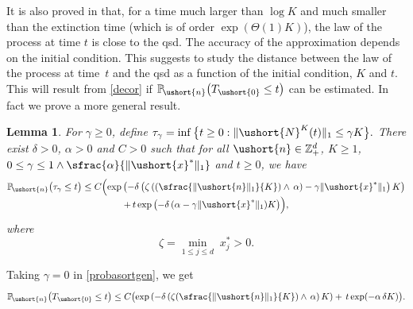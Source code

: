\documentclass[10pt]{amsart}
\newcommand{\Psfrac}[2]{(\sfrac{#1}{#2})}
\numberwithin{equation}{section}
\theoremstyle{plain}
\newtheorem{lemma}[theorem]{Lemma}
\theoremstyle{definition}
\newcommand{\proba}{{\mathbb{P}}}
\newcommand{\zentiers}{{\mathbb{Z}}}
\newcommand{\domaine}{\zentiers_{+}^{d}}
\newcommand{\Thetaun}{\Theta(1)}
\newcommand{\vecn}{\ushort{n}}
\newcommand{\vecxf}{\ushort{x}^*}
\newcommand{\veczer}{\ushort{0}}
\newcommand{\leproc}{\ushort{N}^{K}}
\newcommand{\norm}[1]{\|#1\|_{1}}\let\snorm\norm
\begin{document}
It is also proved in \cite{ccm2} that, for a time much larger than $\log K$ and much smaller than the extinction time
(which is of order $\exp(\Thetaun K)$), the law of the process at time $t$ is close to the qsd. The accuracy of the
approximation depends on the initial condition. This suggests to study the distance between the law of the process at time~$t$ and
the qsd as a function of the initial condition, $K$ and $t$.
This will result from \eqref{decor} if $\proba_{\!\vecn}\bigl(T_{\veczer}\leq t\bigr)$ can be estimated. In fact we prove a more general
result.

\begin{lemma}\label{sortpas}
For $\gamma\geq 0$, define $\tau_{\gamma}=\inf\big\{t\geq 0:\| \leproc(t)\|_1\le \gamma K\big\}.$
There exist $\delta>0$, $\alpha>0$ and $C>0$ such that for all $\vecn\in\domaine$, $K\ge 1$,
$0\le \gamma\le 1\wedge \sfrac{\alpha}{\snorm{\vecxf}}$ and $t\ge0$, we have
\begin{multline}\label{probasortgen}
\proba_{\!\vecn}\bigl(\tau_{\gamma}\leq t\bigr)
\leq C\Bigl(\exp\left(-\delta\left(\zeta\left(\Psfrac{\norm{\vecn}}{K}\wedge\,\alpha\right)-\gamma \norm{\vecxf}\right)K\right)\\[-3pt]
+\, t \exp\left(-\delta\,(\alpha-\gamma \norm{\vecxf}) K\right)\Bigr),
\end{multline}
where
\begin{equation}\label{def-zeta}
\zeta=\min_{1\le j\le d}\;x^*_{j}>0.
\end{equation}
\end{lemma}
Taking $\gamma=0$ in \eqref{probasortgen}, we get
\begin{equation}\label{probasort}
\proba_{\!\vecn}\bigl(T_{\veczer}\leq t\bigr)
\leq C\bigl(\exp\left(-\delta\left(\zeta\Psfrac{\snorm{\vecn}}{K}\wedge\,\alpha\right)K\right)+\, t \exp(-\alpha\,\delta K)\bigr).
\end{equation}
\end{document}

